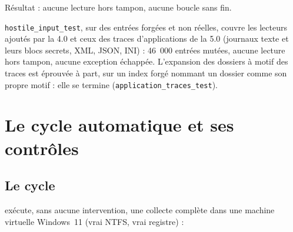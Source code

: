 \documentclass[11pt,a4paper,oneside]{report}
\begin{document}
Résultat : aucune lecture hors tampon, aucune boucle sans fin.

\texttt{hostile\_input\_test}, sur des entrées forgées et non réelles, couvre les
lecteurs ajoutés par la 4.0 et ceux des traces d'applications de la 5.0
(journaux texte et leurs blocs secrets, XML, JSON, INI) : 46~000 entrées
mutées, aucune lecture hors tampon, aucune exception échappée. L'expansion des
dossiers à motif des traces est éprouvée à part, sur un index forgé nommant un
dossier comme son propre motif : elle se termine
(\texttt{application\_traces\_test}).

\chapter{Le cycle automatique et ses contrôles}\label{ch:cycle}

\section{Le cycle}

 exécute, sans aucune intervention, une
collecte complète dans une machine virtuelle Windows~11 (vrai NTFS, vrai
registre) :
\end{document}
